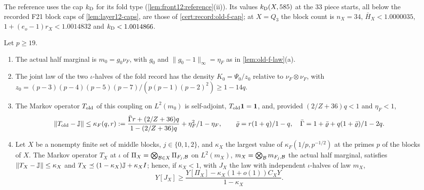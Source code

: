 The reference uses the cap $k_{\rm D}$ for its fold type
(\cref{lem:front12:reference}(ii)). Its values $k_{\rm D}(X,585)$ at the $33$
piece starts, all below the recorded F21 block caps of \cref{lem:layer12-caps},
are those of \cref{cert:record:old-f-cap}; at $X=Q_3$ the block
count is $n_X=34$, $\bar H_X<1.0000035$, $1+(e_o-1)r_X<1.0014832$ and
$k_{\rm D}<1.0014866$.

\begin{corollary}
\label{lem:record:old-f-marginal}
Let $p\ge19$.
\begin{enumerate}[label=(\alph*)]
\item The actual half marginal is $m_0=g_0\nu_F$, with $g_0$ and
 $\|g_0-1\|_\infty=\eta_F$ as in \cref{lem:old-f-law}(a).
\item The joint law of the two $\iota$-halves of the fold record has the density
 $K_0=\Psi_0/z_0$ relative to $\nu_F\otimes\nu_F$, with
 $z_0=(p-3)(p-4)(p-5)(p-7)/(p(p-1)(p-2)^2)\ge1-14q$.
\item The Markov operator $T_{\rm old}$ of this coupling on $L^2(m_0)$ is
 self-adjoint, $T_{\rm old}\mathbf 1=\mathbf 1$, and, provided $(2/Z+36)q<1$ and
 $\eta_F<1$,
 \[
  \|T_{\rm old}-\mathbb J\|\le\kappa_F(q,r):=\dfrac{\bar\Gamma r+(2/Z+36)q}
  {1-(2/Z+36)q}+\eta_F^2/1-\eta_F,\qquad
  \bar\varrho=r(1+q)/1-q,\quad\bar\Gamma=1+\bar\varrho
  +q(1+\bar\varrho)/1-2q.
 \]
\item Let $X$ be a nonempty finite set of middle blocks, $j\in\{0,1,2\}$, and
 $\kappa_X$ the largest value of $\kappa_F(1/p,p^{-1/2})$ at the primes $p$ of
 the blocks of $X$. The Markov operator $T_X$ at $\iota$ of
 $\Pi_X=\bigotimes_{\mathcal B\in X}\Pi_{F_j,\mathcal B}$ on $L^2(m_X)$,
 $m_X=\bigotimes_\mathcal B m_{F_j,\mathcal B}$ the actual half marginal, satisfies
 $\|T_X-\mathbb J\|\le\kappa_X$ and $T_X\preceq(1-\kappa_X)\mathbb J+\kappa_XI$; hence, if
 $\kappa_X<1$, with $J_X$ the law with independent $\iota$-halves of law $m_X$,
 \[
  Y[J_X]\ge\frac{Y[\Pi_X]-\kappa_X(1+o(1))C_XY}{1-\kappa_X}.
 \]
\end{enumerate}
\end{corollary}

